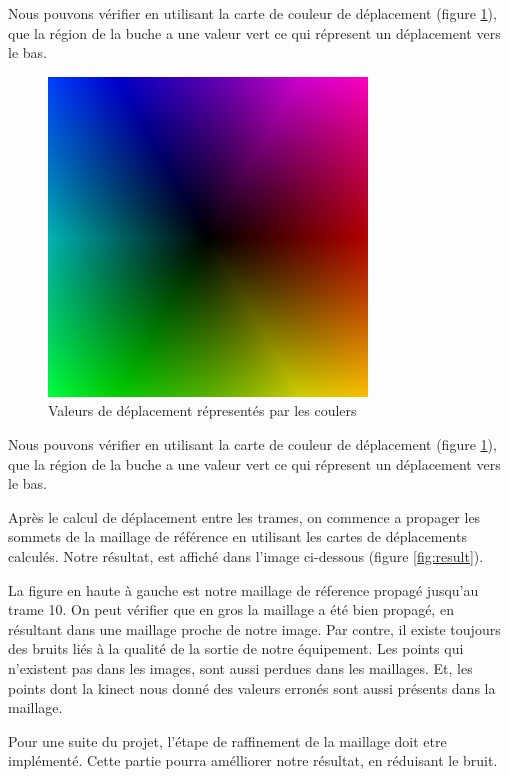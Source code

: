 \documentclass[a4paper,12pt]{article}
\begin{document}
Nous pouvons vérifier en utilisant la carte de couleur de déplacement
(figure \ref{fig:colorChart}), que la région de la buche a une valeur
vert ce qui répresent un déplacement vers le bas.

\begin{figure}[h!]
  \begin{center}
    \includegraphics[scale=0.6]{img/ColorChart}
    \caption{Valeurs de déplacement répresentés par les coulers}
    \label{fig:colorChart}
  \end{center}
\end{figure}

Nous pouvons vérifier en utilisant la carte de couleur de déplacement
(figure \ref{fig:colorChart}), que la région de la buche a une valeur
vert ce qui répresent un déplacement vers le bas.

Après le calcul de déplacement entre les trames, on commence a
propager les sommets de la maillage de référence en utilisant les
cartes de déplacements calculés. Notre résultat, est affiché dans
l'image ci-dessous (figure \ref{fig:result}). 

La figure en haute à gauche est notre maillage de réference propagé
jusqu'au trame 10. On peut vérifier que en gros la maillage a été bien
propagé, en résultant dans une maillage proche de notre image.
Par contre, il existe toujours des bruits liés à la qualité de la
sortie de notre équipement. Les points qui n'existent pas dans les
images, sont aussi perdues dans les maillages. Et, les points dont la
kinect nous donné des valeurs erronés sont aussi présents dans la maillage. 

Pour une suite du projet, l'étape de raffinement de la maillage doit
etre implémenté. Cette partie pourra amélliorer notre résultat, en
réduisant le bruit.
\end{document}
